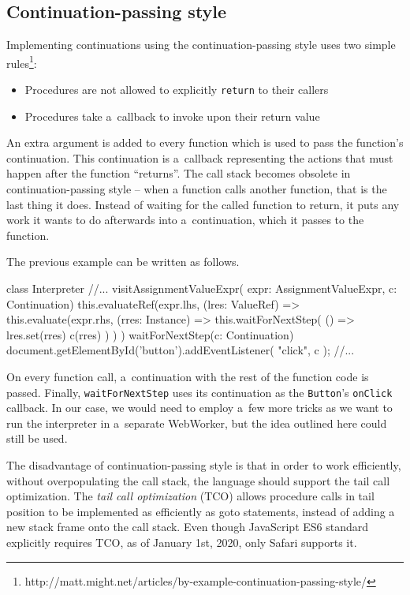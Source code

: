 \subsection*{Continuation-passing style}
\label{chap4:continuations}
Implementing continuations using the continuation-passing style uses two simple rules\footnote{http://matt.might.net/articles/by-example-continuation-passing-style/}:
\begin{itemize}
    \item Procedures are not allowed to explicitly \texttt{return} to their callers
    \item Procedures take a~callback to invoke upon their return value
\end{itemize}
An extra argument is added to every function which is used to pass the function's continuation. This continuation is a~callback
representing the actions that must happen after the function ``returns''. The call stack becomes obsolete in continuation-passing style -- when
a function calls another function, that is the last thing it does. Instead of waiting for the called function to return, it puts any work
it wants to do afterwards into a~continuation, which it passes to the function.

The previous example can be written as follows.
\newpage
\begin{code}
class Interpreter {
    //...
    visitAssignmentValueExpr(
        expr: AssignmentValueExpr, c: Continuation) {
        this.evaluateRef(expr.lhs, (lres: ValueRef) => {
            this.evaluate(expr.rhs, (rres: Instance) => {
                this.waitForNextStep(
                    () => {
                        lres.set(rres)
                        c(rres)
                })
            })
        })
    }
    waitForNextStep(c: Continuation) {
        document.getElementById('button').addEventListener(
            "click",
            c
        );
    }
    //...
}
\end{code}

On every function call, a~continuation with the rest of the function code is passed. Finally, \texttt{waitForNextStep} uses its continuation as the \texttt{Button}'s
\texttt{onClick} callback. In our case, we would need to employ a~few more tricks as we want to run the interpreter in a~separate WebWorker, but the idea
outlined here could still be used.

The disadvantage of continuation-passing style is that in order to work efficiently, without overpopulating the call stack, the language should support the tail
call optimization. The \emph{tail call optimization} (TCO) allows procedure calls in tail position to be implemented as efficiently as goto statements, instead of adding
a new stack frame onto the call stack. Even though JavaScript ES6 standard explicitly requires TCO, as of January 1st, 2020, only Safari supports it.

